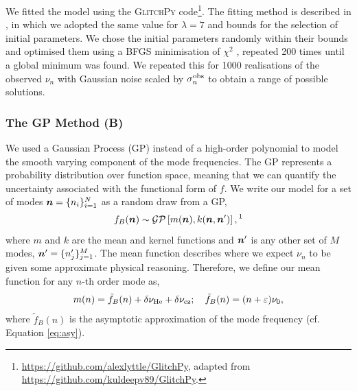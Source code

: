 We fitted the model using the \textsc{GlitchPy} code\footnote{\url{https://github.com/alexlyttle/GlitchPy}, adapted from \url{https://github.com/kuldeepv89/GlitchPy}.}. The fitting method is described in \citet{Verma.Raodeo.ea2019}, in which we adopted the same value for \(\lambda=7\) and bounds for the selection of initial parameters. We chose the initial parameters randomly within their bounds and optimised them using a BFGS minimisation of \(\chi^2\) \citep{Fletcher1987}, repeated 200 times until a global minimum was found. We repeated this for 1000 realisations of the observed \(\nu_n\) with Gaussian noise scaled by \(\sigma_n^{{\mathrm{obs}}}\) to obtain a range of possible solutions.

\subsubsection{The GP Method (B)}

We used a Gaussian Process (GP) instead of a high-order polynomial to model the smooth varying component of the mode frequencies. The GP represents a probability distribution over function space, meaning that we can quantify the uncertainty associated with the functional form of $f$. We write our model for a set of modes \(\bm{n} = \{n_i\}_{i=1}^N\) as a random draw from a GP,
%
\begin{equation}
    f_{B}(\vect{n}) \sim \mathcal{GP}\left[ m(\vect{n}), k(\vect{n}, \vect{n}') \right],\text{\footnotemark}
\end{equation}
%
%
where \(m\) and \(k\) are the mean and kernel functions and \(\bm{n}'\) is any other set of \(M\) modes, \(\bm{n}' = \{n'_j\}_{j=1}^M\). The mean function describes where we expect \(\nu_n\) to be given some approximate physical reasoning. Therefore, we define our mean function for any \(n\)-th order mode as,
%
\begin{equation}
    m(n) = \tilde{f}_B(n) + \delta\nu_{{\mathrm{He}}} + \delta\nu_{{\mathrm{cz}}}; \quad \tilde{f}_B(n) = (n + \varepsilon) \nu_0, \label{eq:asy-glitch}
\end{equation}
%
where \(\tilde{f}_B(n)\) is the asymptotic approximation of the mode frequency (cf. Equation \ref{eq:asy}).

